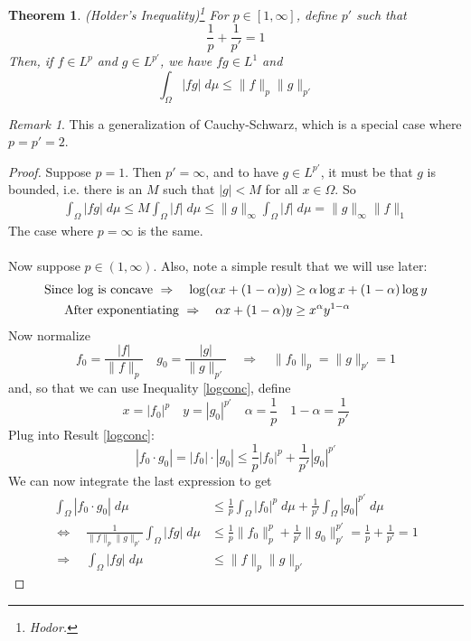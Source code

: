 \documentclass[12pt]{article}
\theoremstyle{plain}
\newtheorem{thm}{Theorem}[subsection]
\theoremstyle{definition}
\theoremstyle{remark}
\newtheorem*{rmk}{Remark}
\begin{document}
\begin{thm}
\emph{(Holder's Inequality)\footnote{Hodor.}}
For $p\in[1,\infty]$, define $p'$ such that
\[
    \frac{1}{p}
    +
    \frac{1}{p'}
    =1
\]
Then, if $f\in L^p$ and $g\in L^{p'}$, we have $fg\in L^1$ and 
\[ 
    \int_\Omega |fg| \; d\mu \leq \lVert f\rVert_p
    \lVert g\rVert_{p'}
\]
\end{thm}
\begin{rmk}
This a generalization of Cauchy-Schwarz, which is a special case where $p=p'=2$.
\end{rmk}
\begin{proof}
Suppose $p=1$. Then $p'=\infty$, and to have $g\in L^{p'}$, it must be that $g$ is bounded, i.e. there is an $M$ such that $|g|<M$ for all $x\in\Omega$. So
\begin{align*}
    \int_\Omega |fg| \; d\mu \leq 
    M\int_\Omega |f| \; d\mu \leq 
    \lVert g\rVert_\infty\int_\Omega |f| \; d\mu 
    = 
    \lVert g\rVert_\infty\lVert f\rVert_1
\end{align*}
The case where $p=\infty$ is the same.
\\
\\
Now suppose $p\in(1,\infty)$. Also, note a simple result that we will use later:
\begin{align}
    \text{Since $\log$ is concave }
    \Rightarrow \quad
    \log(\alpha x + (1-\alpha)y)&\geq
    \alpha \log x + (1-\alpha) \log y\notag\\
    \text{After exponentiating }
    \Rightarrow \quad
    \alpha x + (1-\alpha)y &\geq
    x^\alpha y^{1-\alpha}\label{logconc}
\end{align}
Now normalize
\[
    f_0 = \frac{|f|}{\lVert f\rVert_p}
    \quad
    g_0 = \frac{|g|}{\lVert g\rVert_{p'}}
    \quad \Rightarrow\quad
    \lVert f_0\rVert_p = \lVert g\rVert_{p'}=1
\]
and, so that we can use Inequality \ref{logconc}, define
\[
    x=|f_0|^p 
    \quad 
    y=|g_0|^{p'} 
    \quad
    \alpha=\frac{1}{p} 
    \quad
    1-\alpha=\frac{1}{p'}
\]
Plug into Result \ref{logconc}:
\[
    |f_0 \cdot g_0|=|f_0|\cdot|g_0|\leq 
    \frac{1}{p} |f_0|^p
    +\frac{1}{p'} |g_0|^{p'}
\]
We can now integrate the last expression to get 
\begin{align*}
    \int_\Omega
    |f_0\cdot g_0|\;d\mu&\leq 
    \frac{1}{p}
    \int_\Omega |f_0|^p \;d\mu
    +\frac{1}{p'}\int_\Omega |g_0|^{p'}\;d\mu \\
    \Leftrightarrow\quad
    \frac{1}{\lVert f\rVert_p \lVert g\rVert_{p'}}
    \int_\Omega
    |f g|\;d\mu
    &\leq 
    \frac{1}{p}\lVert f_0\rVert^p_p
    +\frac{1}{p'}\lVert g_0\rVert_{p'}^{p'} 
    = \frac{1}{p} + \frac{1}{p'}=1\\
    \Rightarrow\quad
    \int_\Omega
    |f g|\;d\mu
    &\leq 
    {\lVert f\rVert_p \lVert g\rVert_{p'}}
\end{align*}
\end{proof}
\end{document}
